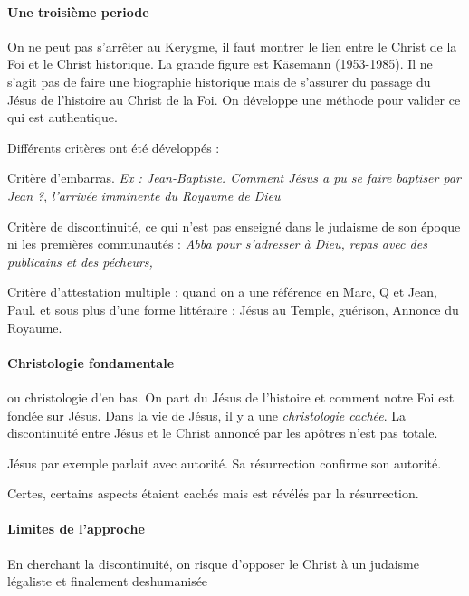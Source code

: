 \paragraph{Une troisième periode} On ne peut pas s'arrêter au Kerygme, il faut montrer le lien entre le Christ de la Foi et le Christ historique. La grande figure est Käsemann (1953-1985). Il ne s'agit pas de faire une biographie historique mais de s'assurer du passage du Jésus de l'histoire au Christ de la Foi. On développe une méthode pour valider ce qui est authentique.
\begin{Prop}
Différents critères ont été développés : 
\bi
\item Critère d'embarras. \textit{Ex : Jean-Baptiste. Comment Jésus a pu se faire baptiser par Jean ?}, \textit{l'arrivée imminente du Royaume de Dieu}
\item Critère de discontinuité, ce qui n'est pas enseigné dans le judaisme de son époque ni les premières communautés : \textit{Abba pour s'adresser à Dieu, repas avec des publicains et des pécheurs, }
\item Critère d'attestation multiple : quand on a une référence en Marc, Q et Jean, Paul. et sous plus d'une forme littéraire : Jésus au Temple, guérison, Annonce du Royaume. 
\ei 
\end{Prop}

\paragraph{Christologie fondamentale} ou christologie d'en bas. On part du Jésus de l'histoire et comment notre Foi est fondée sur Jésus. Dans la vie de Jésus, il y a une \textit{christologie cachée}. La discontinuité entre Jésus et le Christ annoncé par les apôtres n'est pas totale. 
\begin{Ex}
Jésus par exemple parlait avec autorité. Sa résurrection confirme son autorité. 
\end{Ex}

Certes, certains aspects étaient cachés mais est révélés par la résurrection.

\paragraph{Limites de l'approche} En cherchant la discontinuité, on risque d'opposer le Christ à un judaisme légaliste et finalement deshumanisée 

